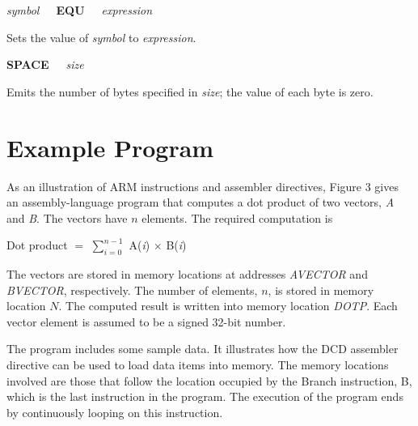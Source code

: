 \documentclass[11pt, twoside, pdftex]{article}
\begin{document}
\noindent
{\it symbol}~~~{\bf EQU}~~~{\it expression}

\noindent
Sets the value of {\it symbol} to {\it expression}.


\noindent
{\bf SPACE}~~~{\it size}

\noindent
Emits the number of bytes specified in {\it size}; the value of each byte is zero.


\section{Example Program}

As an illustration of ARM instructions and assembler directives, 
Figure 3 gives an assembly-language program that computes a dot
product of two vectors, {\it A} and {\it B}. The vectors
have $n$ elements. The required computation is
\begin{center}
Dot product $=$ $\sum_{i = 0}^{n - 1}$ A({\it i}) $\times$ B({\it i})
\end{center}

\noindent
The vectors are stored in memory locations at addresses
{\it AVECTOR} and {\it BVECTOR}, respectively. The number of
elements, $n$, is stored in memory location $N$. The computed result is written
into memory location {\it DOTP}. Each vector element is assumed to be a
signed 32-bit number.

The program includes some sample data. It illustrates how the DCD
assembler directive can be used to load data items into memory. 
The memory locations involved are those
that follow the location occupied by the Branch instruction, B,
which is the last instruction in the program. The execution of
the program ends by continuously looping on this instruction. 
\end{document}
